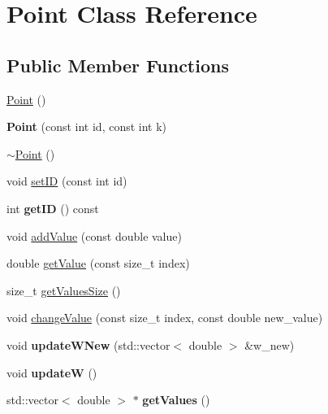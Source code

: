 \hypertarget{class_point}{}\section{Point Class Reference}
\label{class_point}
\subsection*{Public Member Functions}
\begin{DoxyCompactItemize}
\item 
\mbox{\hyperlink{class_point_ad92f2337b839a94ce97dcdb439b4325a}{Point}} ()
\item 
\mbox{\label{class_point_a26d66e5795f1dc9366b14e7c86a38a80}} 
{\bfseries Point} (const int id, const int k)
\item 
\mbox{\hyperlink{class_point_a395fa04b4ec126b66fc053f829a30cc1}{$\sim$\+Point}} ()
\item 
void \mbox{\hyperlink{class_point_ae0c05a7c16aadbb5e9932e77b24ca921}{set\+ID}} (const int id)
\item 
\mbox{\label{class_point_a70f96664692429af8c591eac51e65faa}} 
int {\bfseries get\+ID} () const
\item 
void \mbox{\hyperlink{class_point_a922f5f0685f0bbf2e9e19ff3397fc82e}{add\+Value}} (const double value)
\item 
double \mbox{\hyperlink{class_point_ae748cbf0b68a726dfdfe9f8b8b6301db}{get\+Value}} (const size\+\_\+t index)
\item 
size\+\_\+t \mbox{\hyperlink{class_point_ab5bb69974276cdb13bc74c8585c919a1}{get\+Values\+Size}} ()
\item 
void \mbox{\hyperlink{class_point_a0b2a9878f3eb1b0d091aa7e9b1502258}{change\+Value}} (const size\+\_\+t index, const double new\+\_\+value)
\item 
\mbox{\label{class_point_a253abfb0fe245ffcdbddf1cb8bb1c968}} 
void {\bfseries update\+W\+New} (std\+::vector$<$ double $>$ \&w\+\_\+new)
\item 
\mbox{\label{class_point_a41bd61b26b3fc774f5a968bfcdb46722}} 
void {\bfseries updateW} ()
\item 
\mbox{\label{class_point_a72092e02093421a550277bcf33e5930e}} 
std\+::vector$<$ double $>$ $\ast$ {\bfseries get\+Values} ()

\end{DoxyCompactItemize}
